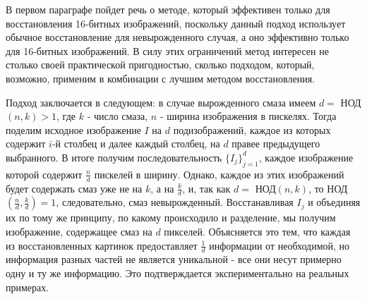 \documentclass[a4paper]{article}
\theoremstyle{definition}
\begin{document}
    В первом параграфе пойдет речь о методе, который эффективен только для восстановления 16-битных изображений, поскольку данный подход использует обычное восстановление для невырожденного случая, а оно эффективно только для 16-битных изображений. В силу этих ограничений метод интересен не столько своей практической пригодностью, сколько подходом, который, возможно, применим в комбинации с лучшим методом восстановления.


    Подход заключается в следующем: в случае вырожденного смаза имеем $d =$ НОД$(n, k) > 1$, где $k$ - число смаза, $n$ - ширина изображения в пискелях. Тогда поделим исходное изображение $I$ на $d$ подизображений, каждое из которых содержит $i$-й столбец и далее каждый столбец, на $d$ правее предыдущего выбранного. В итоге получим последовательность $\{I_j\}_{j=1}^{d}$, каждое изображение которой содержит $\frac{n}{d}$ пискелей в ширину. Однако, каждое из этих изображений будет содержать смаз уже не на $k$, а на $\frac{k}{d}$, и, так как $d =$ НОД$(n, k)$, то НОД$(\frac{n}{d}, \frac{k}{d}) = 1$, следовательно, смаз невырожденный. Восстанавливая $I_j$ и объединяя их по тому же принципу, по какому происходило и разделение, мы получим изображение, содержащее смаз на $d$ пикселей. Объясняется это тем, что каждая из восстановленных картинок предоставляет $\frac{1}{d}$ информации от необходимой, но информация разных частей не является уникальной - все они несут примерно одну и ту же информацию. Это подтверждается экспериментально на реальных примерах.

\newpage
\end{document}
